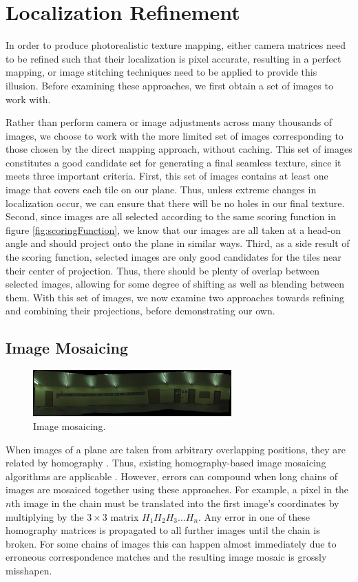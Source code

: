 \documentclass[10pt,twocolumn,letterpaper]{article}
\begin{document}
\section{Localization Refinement}
In order to produce photorealistic texture mapping, either camera
matrices need to be refined such that their localization is pixel
accurate, resulting in a perfect mapping, or image stitching
techniques need to be applied to provide this illusion. Before
examining these approaches, we first obtain a set of images to work
with.

Rather than perform camera or image adjustments across many thousands
of images, we choose to work with the more limited set of images
corresponding to those chosen by the direct mapping approach, without
caching. This set of images constitutes a good candidate set for
generating a final seamless texture, since it meets three important
criteria. First, this set of images contains at least one image that
covers each tile on our plane. Thus, unless extreme changes in
localization occur, we can ensure that there will be no holes in our
final texture. Second, since images are all selected according to the
same scoring function in figure \ref{fig:scoringFunction}, we know
that our images are all taken at a head-on angle and should project
onto the plane in similar ways. Third, as a side result of the scoring
function, selected images are only good candidates for the tiles near
their center of projection. Thus, there should be plenty of overlap
between selected images, allowing for some degree of shifting as well
as blending between them. With this set of images, we now examine two
approaches towards refining and combining their projections, before demonstrating our own.

\subsection{Image Mosaicing}

\begin{figure}
  \centering
  \includegraphics[width=3in]{panoMy.jpg}
  \caption{Image mosaicing. }
  \label{fig:mosaic}
\end{figure}


When images of a plane are taken from arbitrary overlapping positions,
they are related by homography \cite{hz}. Thus, existing
homography-based image mosaicing algorithms are applicable
\cite{brown2007automatic}. However, errors can compound when long
chains of images are mosaiced together using these approaches. For
example, a pixel in the $n$th image in the chain must be translated
into the first image's coordinates by multiplying by the $3\times3$
matrix $H_1 H_2 H_3 ... H_n$. Any error in one of these homography
matrices is propagated to all further images until the chain is
broken. For some chains of images this can happen almost immediately
due to erroneous correspondence matches and the resulting image mosaic
is grossly misshapen.
\end{document}
